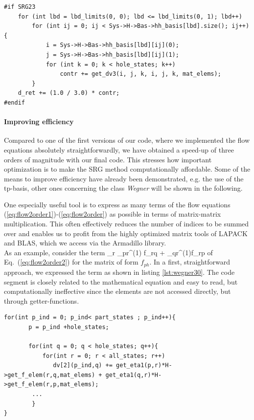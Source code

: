 \begin{lstlisting}[float, caption={Optional inclusion of loop terms corresponding to three-body interactions, here the contribution to $dE_0/ds$.},label={lst:wegner2}]
#if SRG23
    for (int lbd = lbd_limits(0, 0); lbd <= lbd_limits(0, 1); lbd++)
        for (int ij = 0; ij < Sys->H->Bas->hh_basis[lbd].size(); ij++) {
            i = Sys->H->Bas->hh_basis[lbd][ij](0);
            j = Sys->H->Bas->hh_basis[lbd][ij](1);
            for (int k = 0; k < hole_states; k++)
                contr += get_dv3(i, j, k, i, j, k, mat_elems);
        }
    d_ret += (1.0 / 3.0) * contr;
#endif
\end{lstlisting}


\paragraph{Improving efficiency}
Compared to one of the first versions of our code, where we implemented the flow equations absolutely straightforwardly, we have obtained a speed-up of three orders of magnitude with our final code. This stresses how important optimization is to make the SRG method computationally affordable. Some of the means to improve efficiency have already been demonstrated, e.g. the use of the tp-basis, other ones concerning the class \textit{Wegner} will be shown in the following.

One especially useful tool is to express as many terms of the flow equations (\ref{eq:flow2order1})-(\ref{eq:flow2order})  as possible in terms of matrix-matrix multiplication. This often effectively reduces the number of indices to be summed over and enables us to profit from the highly optimized matrix tools of LAPACK and BLAS, which we access via the Armadillo library. \\
As an example, consider the term
\be
\sum_r \lb \eta_{pr}^{(1)} f_{rq} + \eta_{qr}^{(1)}f_{rp}\rb
\label{eq:fphterm}
\ee
of Eq.~(\ref{eq:flow2order2}) for the matrix of form $f_ {ph}$. In a first, straightforward approach, we expressed the term as shown in listing \ref{lst:wegner30}. The code segment is closely related to the mathematical equation and easy to read, but computationally ineffective since the elements are not accessed directly, but through getter-functions.

\begin{lstlisting}[float,caption={Term (\ref{eq:fphterm}) implemented straightforwardly, i.e. close to mathematical notation, and therefore easy to read.},label={lst:wegner30}]
for(int p_ind = 0; p_ind< part_states ; p_ind++){
       p = p_ind +hole_states;
        
       for(int q = 0; q < hole_states; q++){           
           for(int r = 0; r < all_states; r++)           
              dv[2](p_ind,q) += get_eta1(p,r)*H->get_f_elem(r,q,mat_elems) + get_eta1(q,r)*H->get_f_elem(r,p,mat_elems);
        ...
        }
}
\end{lstlisting}

